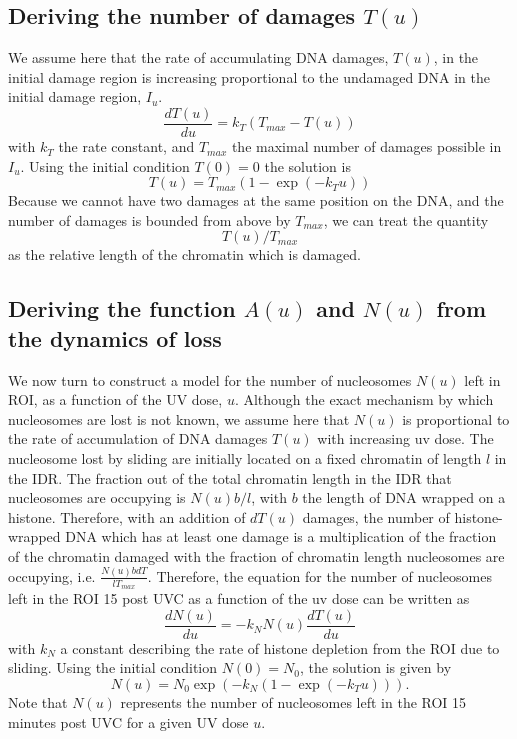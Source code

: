 \documentclass[12pt]{article}
\begin{document}
\subsection{Deriving the number of damages $T(u)$}
We assume here that the rate of accumulating DNA damages, $T(u)$, in the initial damage region is increasing proportional to the undamaged DNA in the initial damage region, $I_u$.
\begin{equation}
\frac{dT(u)}{du}=k_T\left(T_{max}-T(u)\right)
\end{equation}
with $k_T$ the rate constant, and $T_{max}$ the maximal number of damages possible in $I_u$. 
Using the initial condition $T(0) = 0$ the solution is
\begin{equation}
T(u) = T_{max}\left(1-\exp(-k_T u)\right) 
\end{equation}
Because we cannot have two damages at the same position on the DNA, and the number of damages is bounded from above by $T_{max}$, we can treat the quantity 
\begin{equation*}
T(u)/T_{max}
\end{equation*}
as the relative length of the chromatin which is damaged.

\subsection{Deriving the function $A(u)$ and $N(u)$ from the dynamics of loss}
We now turn to construct a model for the number of nucleosomes $N(u)$ left in ROI, as a function of the UV dose, $u$. Although the exact mechanism by which nucleosomes are lost is not known, we assume here that $N(u)$ is proportional to the rate of accumulation of DNA damages $T(u)$ with increasing uv dose. The nucleosome lost by sliding are initially located on a fixed chromatin of length $l$ in the IDR. The fraction out of the total chromatin length in the IDR that nucleosomes are occupying is $N(u)b/l$, with $b$ the length of DNA wrapped on a histone. Therefore, with an addition of $dT(u)$ damages, the number of histone-wrapped DNA which has at least one damage is a multiplication of the fraction of the chromatin damaged with the fraction of chromatin length nucleosomes are occupying, i.e. $ \frac{N(u)bdT}{lT_{max}} $. Therefore, the equation for the number of nucleosomes left in the ROI 15 post UVC as a function of the uv dose can be written as
\begin{equation*}
\frac{dN(u)}{du} = -k_NN(u)\frac{dT(u)}{du}
\end{equation*}
with $k_N$ a constant describing the rate of histone depletion from the ROI due to sliding. Using the initial condition $N(0) = N_0$, the solution is given by
\begin{equation}\label{eq:NumHistones}
N(u) = N_0\exp\left(-k_N\left(1-\exp(-k_Tu)\right)\right).
\end{equation}
Note that $N(u)$ represents the number of nucleosomes left in the ROI 15 minutes post UVC for a given UV dose $u$.
\end{document}
